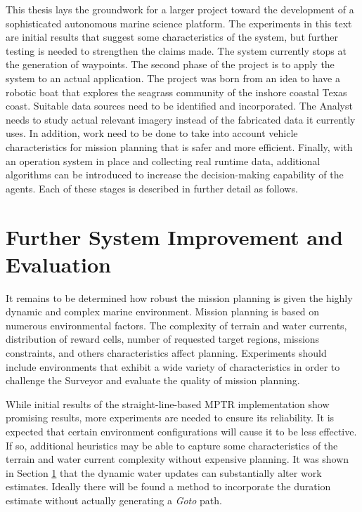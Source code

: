 \documentclass{tamuccthesis}
\begin{document}
This thesis lays the groundwork for a larger project toward the development of a sophisticated autonomous marine science platform. The experiments in this text are initial results that suggest some characteristics of the system, but further testing is needed to strengthen the claims made. The system currently stops at the generation of waypoints. The second phase of the project is to apply the system to an actual application. The project was born from an idea to have a robotic boat that explores the seagrass community of the inshore coastal Texas coast. Suitable data sources need to be identified and incorporated. The Analyst needs to study actual relevant imagery instead of the fabricated data it currently uses. In addition, work need to be done to take into account vehicle characteristics for mission planning that is safer and more efficient. Finally, with an operation system in place and collecting real runtime data, additional algorithms can be introduced to increase the decision-making capability of the agents. Each of these stages is described in further detail as follows.

\section{Further System Improvement and Evaluation}

It remains to be determined how robust the mission planning is given the highly dynamic and complex marine environment. Mission planning is based on numerous environmental factors. The complexity of terrain and water currents, distribution of reward cells, number of requested target regions, missions constraints, and others characteristics affect planning. Experiments should include environments that exhibit a wide variety of characteristics in order to challenge the Surveyor and evaluate the quality of mission planning. 

While initial results of the straight-line-based MPTR implementation show promising results, more experiments are needed to ensure its reliability. It is expected that certain environment configurations will cause it to be less effective. If so, additional heuristics may be able to capture some characteristics of the terrain and water current complexity without expensive planning. It was shown in Section \ref{} that the dynamic water updates can substantially alter work estimates. Ideally there will be found a method to incorporate the duration estimate without actually generating a \textit{Goto} path. 
\end{document}
